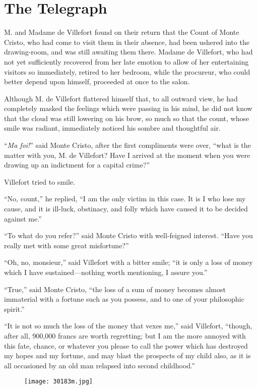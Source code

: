 \chapter{The Telegraph}

M. and Madame de Villefort found on their return that the Count of
Monte Cristo, who had come to visit them in their absence, had been
ushered into the drawing-room, and was still awaiting them there.
Madame de Villefort, who had not yet sufficiently recovered from her
late emotion to allow of her entertaining visitors so immediately,
retired to her bedroom, while the procureur, who could better depend
upon himself, proceeded at once to the salon.

Although M. de Villefort flattered himself that, to all outward view,
he had completely masked the feelings which were passing in his mind,
he did not know that the cloud was still lowering on his brow, so much
so that the count, whose smile was radiant, immediately noticed his
sombre and thoughtful air.

“\textit{Ma foi!}” said Monte Cristo, after the first compliments were over,
“what is the matter with you, M. de Villefort? Have I arrived at the
moment when you were drawing up an indictment for a capital crime?”

Villefort tried to smile.

“No, count,” he replied, “I am the only victim in this case. It is I
who lose my cause, and it is ill-luck, obstinacy, and folly which have
caused it to be decided against me.”

“To what do you refer?” said Monte Cristo with well-feigned interest.
“Have you really met with some great misfortune?”

“Oh, no, monsieur,” said Villefort with a bitter smile; “it is only a
loss of money which I have sustained—nothing worth mentioning, I assure
you.”

“True,” said Monte Cristo, “the loss of a sum of money becomes almost
immaterial with a fortune such as you possess, and to one of your
philosophic spirit.”

“It is not so much the loss of the money that vexes me,” said
Villefort, “though, after all, 900,000 francs are worth regretting; but
I am the more annoyed with this fate, chance, or whatever you please to
call the power which has destroyed my hopes and my fortune, and may
blast the prospects of my child also, as it is all occasioned by an old
man relapsed into second childhood.”

\begin{figure}[ht]
\texttt{[image: 30183m.jpg]}
\end{figure}

